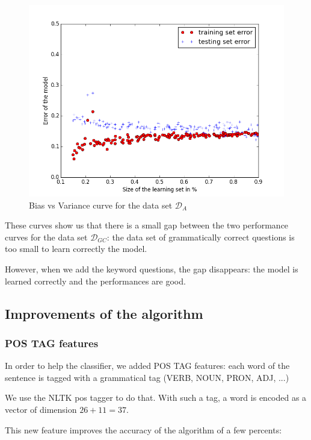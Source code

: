\begin{figure}[!ht]
  \centering
  \caption{Bias vs Variance curve for the data set  $\mathcal{D}_{A}$ }
  \label{sandalone:bias_vs_variance_3}
    \includegraphics[scale=0.5]{../NLP-standalone-images/BiasVsVarianceD_A.png}
\end{figure}

These curves show us that there is a small gap between the two performance curves for the data set $\mathcal{D}_{GC}$: the data set of grammatically correct questions is too small to learn correctly the model.

However, when we add the keyword questions, the gap disappears: the model is learned correctly and the performances are good.

\subsection{Improvements of the algorithm}

\subsubsection{POS TAG features}

In order to help the classifier, we added POS TAG features: each word of the sentence is tagged with a grammatical tag (VERB, NOUN, PRON, ADJ, ...)

We use the NLTK pos tagger to do that. With such a tag, a word is encoded as a vector of dimension $26+11 = 37$.

This new feature improves the accuracy of the algorithm of a few percents:

